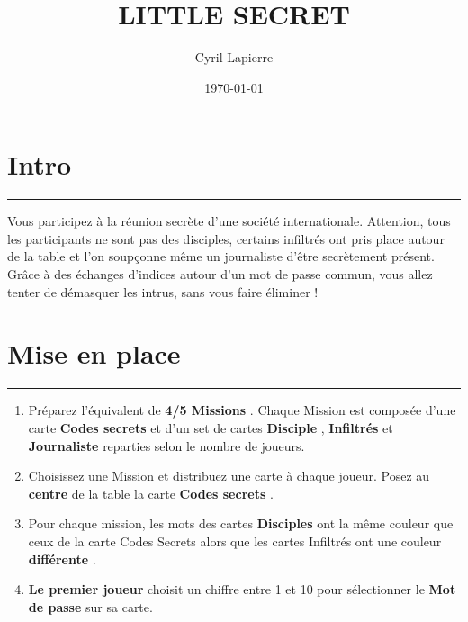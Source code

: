 \documentclass{article}%
\title{LITTLE SECRET}%
\author{Cyril Lapierre}%
\date{\today}%
\begin{document}
%
\normalsize%
\maketitle\thispagestyle{header}%
\pagestyle{header}%
\sectionfont{\color{blue}}%
\subsectionfont{\color{blue}}%
\subsubsectionfont{\color{blue}}%
\section{ Intro
}%
\label{sec:Intro}%
\textcolor{blue}{\rule{18cm}{0.07cm}}\break%
Vous participez à la réunion secrète d'une société internationale. Attention, tous les participants ne sont pas des disciples, certains infiltrés ont pris place autour de la table et l'on soupçonne même un journaliste d'être secrètement présent. Grâce à des échanges d'indices autour d'un mot de passe commun, vous allez tenter de démasquer les intrus, sans vous faire éliminer !


%
\sectionfont{\color{mygreen}}%
\subsectionfont{\color{mygreen}}%
\subsubsectionfont{\color{mygreen}}%
\section{ Mise en place
}%
\label{sec:Miseenplace}%
\textcolor{mygreen}{\rule{18cm}{0.07cm}}\break%
\begin{enumerate}%
\item%
%
 Préparez l'équivalent de %
\textcolor{mygreen}{%
\textbf{4/5 Missions}%
}%
. Chaque Mission est composée d'une carte %
\textcolor{mygreen}{%
\textbf{Codes secrets}%
}%
\textit{ }%
 et d'un set de cartes %
\textcolor{mygreen}{%
\textbf{Disciple}%
}%
,%
\textcolor{mygreen}{%
\textbf{ Infiltrés}%
}%
\textit{ }%
 et %
\textcolor{mygreen}{%
\textbf{Journaliste}%
}%
\textit{ }%
 reparties selon le nombre de joueurs.
%
\item%
%
 Choisissez une Mission et distribuez une carte à chaque joueur. Posez au %
\textcolor{mygreen}{%
\textbf{centre}%
}%
\textit{ }%
 de la table la carte %
\textcolor{mygreen}{%
\textbf{Codes secrets}%
}%
.
%
\item%
%
 Pour chaque mission, les mots des cartes %
\textcolor{mygreen}{%
\textbf{Disciples}%
}%
\textit{ }%
 ont la même couleur que ceux de la carte Codes Secrets alors que les cartes Infiltrés ont une couleur %
\textcolor{mygreen}{%
\textbf{différente}%
}%
.
%
\item%
%
\textcolor{mygreen}{%
\textbf{Le premier joueur}%
}%
\textit{ }%
 choisit un chiffre entre 1 et 10 pour sélectionner le %
\textcolor{mygreen}{%
\textbf{Mot de passe}%
}%
\textit{ }%
 sur sa carte.
%
\end{enumerate}
\end{document}
